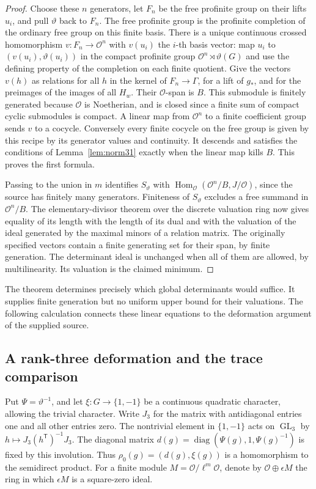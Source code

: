 \documentclass[a4paper,11pt]{article}
\theoremstyle{definition}
\theoremstyle{remark}
\numberwithin{equation}{section}
\newcommand{\GL}{\operatorname{GL}}
\newcommand{\OO}{\mathcal O}
\begin{document}
\begin{proof}
Choose these \(n\) generators, let \(F_n\) be the free profinite group on their lifts \(u_i\), and pull \(\vartheta\) back to \(F_n\). The free profinite group is the profinite completion of the ordinary free group on this finite basis. There is a unique continuous crossed homomorphism \(v:F_n\to\OO^n\) with \(v(u_i)\) the \(i\)-th basis vector: map \(u_i\) to \((v(u_i),\vartheta(u_i))\) in the compact profinite group \(\OO^n\rtimes\vartheta(G)\) and use the defining property of the completion on each finite quotient. Give the vectors \(v(h)\) as relations for all \(h\) in the kernel of \(F_n\to\Gamma\), for a lift of \(g_*\), and for the preimages of the images of all \(H_w\). Their \(\OO\)-span is \(B\). This submodule is finitely generated because \(\OO\) is Noetherian, and is closed since a finite sum of compact cyclic submodules is compact. A linear map from \(\OO^n\) to a finite coefficient group sends \(v\) to a cocycle. Conversely every finite cocycle on the free group is given by this recipe by its generator values and continuity. It descends and satisfies the conditions of Lemma~\ref{lem:norm31} exactly when the linear map kills \(B\). This proves the first formula.

Passing to the union in \(m\) identifies \(S_\vartheta\) with \(\operatorname{Hom}_{\OO}(\OO^n/B,J/\OO)\), since the source has finitely many generators. Finiteness of \(S_\vartheta\) excludes a free summand in \(\OO^n/B\). The elementary-divisor theorem over the discrete valuation ring now gives equality of its length with the length of its dual and with the valuation of the ideal generated by the maximal minors of a relation matrix. The originally specified vectors contain a finite generating set for their span, by finite generation. The determinant ideal is unchanged when all of them are allowed, by multilinearity. Its valuation is the claimed minimum.
\end{proof}

The theorem determines precisely which global determinants would suffice. It supplies finite generation but no uniform upper bound for their valuations. The following calculation connects these linear equations to the deformation argument of the supplied source.

\subsection{A rank-three deformation and the trace comparison}\label{nav:IV-02}
\label{sec:deform31}

Put \(\Psi=\vartheta^{-1}\), and let \(\xi:G\to\{1,-1\}\) be a continuous quadratic character, allowing the trivial character. Write \(J_3\) for the matrix with antidiagonal entries one and all other entries zero. The nontrivial element in \(\{1,-1\}\) acts on \(\GL_3\) by \(h\mapsto J_3(h^{\mathsf T})^{-1}J_3\). The diagonal matrix \(d(g)=\operatorname{diag}(\Psi(g),1,\Psi(g)^{-1})\) is fixed by this involution. Thus \(\rho_0(g)=(d(g),\xi(g))\) is a homomorphism to the semidirect product. For a finite module \(M=\OO/\ell^m\OO\), denote by \(\OO\oplus\epsilon M\) the ring in which \(\epsilon M\) is a square-zero ideal.
\end{document}
